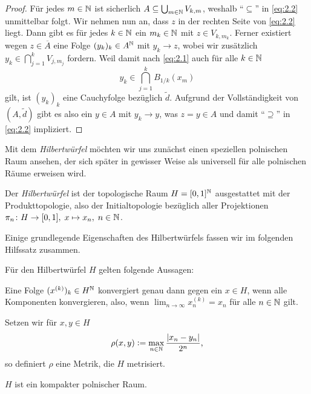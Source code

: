 \documentclass[../main/main.tex]{subfiles}
\begin{document}
\begin{proof}
		Für jedes $m \in \mathbb{N}$ ist sicherlich $A \subseteq 
		\bigcup_{m \in \mathbb{N}} V_{k, m}$, weshalb \enquote{$\subseteq$} 
		in \eqref{eq:2.2} unmittelbar folgt.
		Wir nehmen nun an, dass $z$ in der rechten Seite von \eqref{eq:2.2} liegt. 
		Dann gibt es für jedes $k \in \mathbb{N}$ ein $m_k \in \mathbb{N}$ mit $z \in V_{k, m_k}$. 
		Ferner existiert wegen $z \in \overline{A}$ eine Folge $(y_k)_k \in A^{\mathbb{N}}$ 
		mit $y_k \to z$, wobei wir zusätzlich
		$y_k \in \bigcap_{j=1}^{k} V_{j, m_j}$
		fordern. Weil damit nach \eqref{eq:2.1} auch für alle $k \in \mathbb{N}$
		\[y_k \in \bigcap_{j=1}^{k} B_{1/k}(x_m)\]
		gilt, ist $(y_k)_k$ eine Cauchyfolge bezüglich $\tilde{d}$. Aufgrund der Vollständigkeit von 
		$(A, \tilde{d})$ gibt es also ein $y \in A$ mit $y_k \to y$, was 
		$z = y \in A$ und damit \enquote{$\supseteq$} 
		in \eqref{eq:2.2} impliziert.
	\end{proof}
	
	Mit dem \emph{Hilbertwürfel} möchten wir uns zunächst einen speziellen polnischen Raum ansehen, 
	der sich später in gewisser Weise als universell für alle polnischen Räume erweisen wird.
	
	\begin{Definition}[Hilbertwürfel]
		Der \emph{Hilbertwürfel} ist der topologische Raum $H = [0, 1]^{\mathbb{N}}$ 
		ausgestattet mit der Produkttopologie, also der Initialtopologie bezüglich 
		aller Projektionen $\pi_n \colon H \to [0, 1], \; x \mapsto x_n , \; n \in \mathbb{N}$.
	\end{Definition}

	Einige grundlegende Eigenschaften des Hilbertwürfels fassen wir im folgenden Hilfssatz zusammen.
	
	\begin{Hilfssatz}
		\label{lem:hilbertcube}
		Für den Hilbertwürfel $H$ gelten folgende Aussagen:
		\begin{enumeratethm}
			\item Eine Folge $(x^{(k)})_k \in H^{\mathbb{N}}$ konvergiert genau dann gegen 
			ein $x \in H$, wenn alle Komponenten konvergieren, also, wenn
			$\lim_{n \to \infty} x_n^{(k)} = x_n$ für alle $n \in \mathbb{N}$ gilt.
			\item Setzen wir für $x, y \in H$
			$$\rho(x, y) \vcentcolon = \max_{n \in \mathbb{N}} \frac{|x_n - y_n|}{2^n} \text{,}$$
			so definiert $\rho$ eine Metrik, die $H$ metrisiert.
			\item $H$ ist ein kompakter polnischer Raum.
		\end{enumeratethm}
	\end{Hilfssatz}
	
\end{document}
